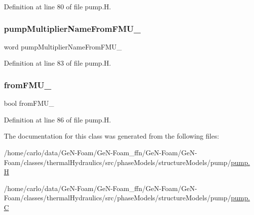 Definition at line 80 of file pump.\+H.

\mbox{\label{classFoam_1_1pump_a0038c356a4b31e6d0b224a3cac274211}} 
\subsubsection{\texorpdfstring{pump\+Multiplier\+Name\+From\+F\+M\+U\+\_\+}{pumpMultiplierNameFromFMU\_}}
{\footnotesize\ttfamily word pump\+Multiplier\+Name\+From\+F\+M\+U\+\_\+\hspace{0.3cm}{\ttfamily [protected]}}



Definition at line 83 of file pump.\+H.

\mbox{\label{classFoam_1_1pump_ab9bab6689728aa9097d385b0668c84d9}} 
\subsubsection{\texorpdfstring{from\+F\+M\+U\+\_\+}{fromFMU\_}}
{\footnotesize\ttfamily bool from\+F\+M\+U\+\_\+\hspace{0.3cm}{\ttfamily [protected]}}



Definition at line 86 of file pump.\+H.



The documentation for this class was generated from the following files\+:\begin{DoxyCompactItemize}
\item 
/home/carlo/data/\+Ge\+N-\/\+Foam/\+Ge\+N-\/\+Foam\+\_\+ffn/\+Ge\+N-\/\+Foam/\+Ge\+N-\/\+Foam/classes/thermal\+Hydraulics/src/phase\+Models/structure\+Models/pump/\hyperlink{pump_8H}{pump.\+H}\item 
/home/carlo/data/\+Ge\+N-\/\+Foam/\+Ge\+N-\/\+Foam\+\_\+ffn/\+Ge\+N-\/\+Foam/\+Ge\+N-\/\+Foam/classes/thermal\+Hydraulics/src/phase\+Models/structure\+Models/pump/\hyperlink{pump_8C}{pump.\+C}\end{DoxyCompactItemize}
